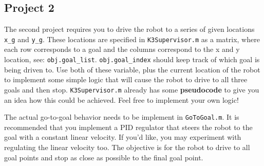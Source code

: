 \documentclass[10pt]{article}
\begin{document}
\subsection*{Project 2}
The second project requires you to drive the robot to a series of given locations \texttt{x\_g} and \texttt{y\_g}. These locations are specified in \texttt{K3Supervisor.m} as a matrix, where each row corresponds to a goal and the columns correspond to the x and y location, see: \texttt{obj.goal\_list}. \texttt{obj.goal\_index} should keep track of which goal is being driven to. Use both of these variable, plus the current location of the robot to implement some simple logic that will cause the robot to drive to all three goals and then stop. \texttt{K3Supervisor.m} already has some \textbf{pseudocode} to give you an idea how this could be achieved. Feel free to implement your own logic!

The actual go-to-goal behavior needs to be implement in \texttt{GoToGoal.m}. It is recommended that you implement a PID regulator that steers the robot to the goal with a constant linear velocity. If you'd like, you may experiment with regulating the linear velocity too. The objective is for the robot to drive to all goal points and stop as close as possible to the final goal point.
\end{document}

